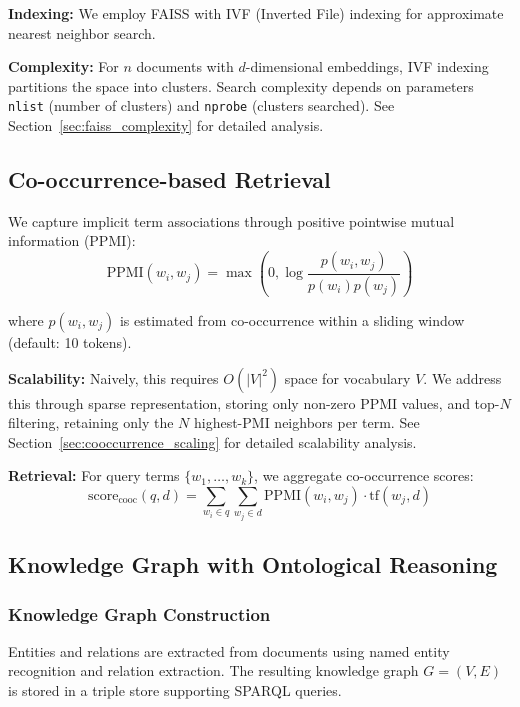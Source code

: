 \documentclass[11pt,a4paper]{article}
\begin{document}
\textbf{Indexing:} We employ FAISS \citep{johnson2019billion} with IVF (Inverted File) indexing for approximate nearest neighbor search.

\textbf{Complexity:} For $n$ documents with $d$-dimensional embeddings, IVF indexing partitions the space into clusters. Search complexity depends on parameters \texttt{nlist} (number of clusters) and \texttt{nprobe} (clusters searched). See Section~\ref{sec:faiss_complexity} for detailed analysis.

\subsection{Co-occurrence-based Retrieval}
\label{sec:cooccurrence}

We capture implicit term associations through positive pointwise mutual information (PPMI):
\begin{equation}
\text{PPMI}(w_i, w_j) = \max\left(0, \log \frac{p(w_i, w_j)}{p(w_i) p(w_j)}\right)
\end{equation}

where $p(w_i, w_j)$ is estimated from co-occurrence within a sliding window (default: 10 tokens).

\textbf{Scalability:} Naively, this requires $O(|V|^2)$ space for vocabulary $V$. We address this through sparse representation, storing only non-zero PPMI values, and top-$N$ filtering, retaining only the $N$ highest-PMI neighbors per term. See Section~\ref{sec:cooccurrence_scaling} for detailed scalability analysis.

\textbf{Retrieval:} For query terms $\{w_1, \ldots, w_k\}$, we aggregate co-occurrence scores:
\begin{equation}
\text{score}_{\text{cooc}}(q, d) = \sum_{w_i \in q} \sum_{w_j \in d} \text{PPMI}(w_i, w_j) \cdot \text{tf}(w_j, d)
\end{equation}

\subsection{Knowledge Graph with Ontological Reasoning}
\label{sec:kg_retrieval}

\subsubsection{Knowledge Graph Construction}

Entities and relations are extracted from documents using named entity recognition and relation extraction. The resulting knowledge graph $G = (V, E)$ is stored in a triple store supporting SPARQL queries.
\end{document}
